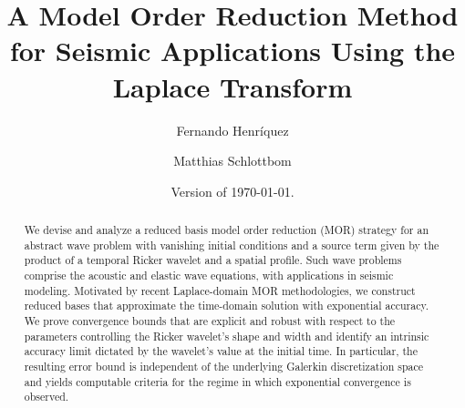 \def\cdf(#1)(#2)(#3){0.5*(1+(erf((#1-#2)/(#3*sqrt(2)))))}%

\DeclareMathOperator{\CDF}{cdf}

\setcounter{tocdepth}{2}



\title{A Model Order Reduction Method for Seismic Applications Using the Laplace Transform%
}


\author{Fernando Henr\'iquez         \and
        Matthias Schlottbom %
}



\date{Version of \today.}


\maketitle

\begin{abstract}
We devise and analyze a reduced basis model order reduction (MOR) strategy for an abstract wave problem with vanishing initial conditions and a source term given by the product of a temporal Ricker wavelet and a spatial profile. Such wave problems comprise the acoustic and elastic wave equations, with applications in seismic modeling. Motivated by recent Laplace-domain MOR methodologies, we construct reduced bases that approximate the time-domain solution with exponential accuracy. We prove convergence bounds that are explicit and robust with respect to the parameters controlling the Ricker wavelet’s shape and width and identify an intrinsic accuracy limit dictated by the wavelet’s value at the initial time. In particular, the resulting error bound is independent of the underlying Galerkin discretization space and yields computable criteria for the regime in which exponential convergence is observed.
\end{abstract}

